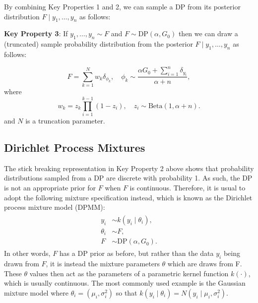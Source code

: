 \documentclass[nojss]{jss}
\begin{document}
By combining Key Properties 1 and 2, we can sample a DP from its posterior distribution $F \mid y_1,\ldots,y_n$ as follows:

\begin{tcolorbox}

\textbf{Key Property 3}:  If $y_1,\ldots,y_n \sim F$ and $F \sim \text{DP} (\alpha, G_0)$ then we can draw a (truncated) sample probability distribution from the posterior $F\mid y_1,\ldots,y_n$ as follows:

$$F = \sum_{k=1}^N w_k \delta_{\phi_k}, \quad \phi_k \sim \frac{\alpha G_0 + \sum_{i=1}^n \delta_{y_i}}{\alpha+n},$$
where
$$w_k = z_k \prod_{i=1}^{k-1} (1-z_i),\quad z_i \sim \text{Beta}(1,\alpha+n).$$
and $N$ is a truncation parameter.

\end{tcolorbox}




\subsection{Dirichlet Process Mixtures} \label{subsec:dpm}
The stick breaking representation in Key Property 2 above shows that  probability distributions sampled from a DP are discrete with probability 1. As such, the DP is not an appropriate prior for $F$ when $F$ is continuous. Therefore, it is usual to adopt the following mixture specification instead, which is known as the Dirichlet process mixture model (DPMM):
\begin{align}
\begin{split}
y_i &\sim k(y_i \mid \theta_i), \\
\theta_i &\sim F, \\
F &\sim \text{DP} (\alpha, G_0).
\end{split}
\label{eqn:dpmm}
\end{align}
In other words, $F$ has a DP prior as before, but rather than the data $y_i$ being drawn from $F$, it is instead the mixture parameters $\theta$ which are draws from F.  These $\theta$ values then act as the parameters of a parametric kernel function $k(\cdot)$, which is usually continuous. The most commonly used example is the Gaussian mixture model where $\theta_i = (\mu_i,\sigma^2_i)$ so that $k(y_i \mid \theta_i) = N(y_i \mid \mu_i,\sigma^2_i)$.
\end{document}
